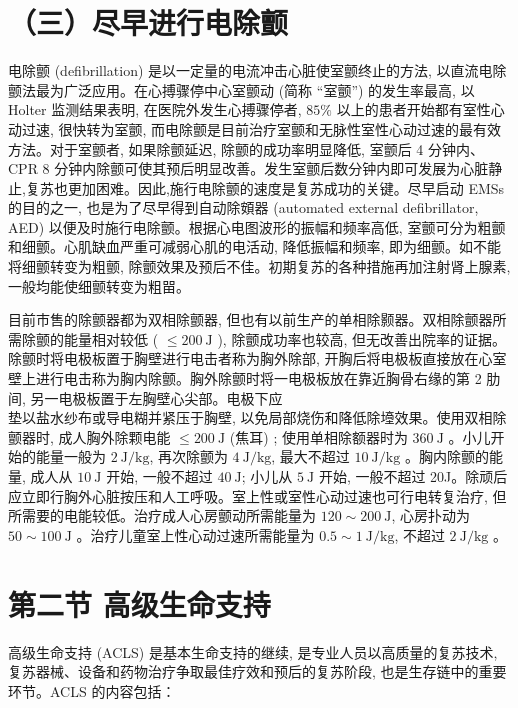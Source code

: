 \documentclass[10pt]{article}
\begin{document}
\section*{（三）尽早进行电除颤}
电除颤 (defibrillation) 是以一定量的电流冲击心脏使室颤终止的方法, 以直流电除颤法最为广泛应用。在心搏骤停中心室颤动 (简称 “室颤”) 的发生率最高, 以 Holter 监测结果表明, 在医院外发生心搏骤停者, $85 \%$ 以上的患者开始都有室性心动过速, 很快转为室颤, 而电除颤是目前治疗室颤和无脉性室性心动过速的最有效方法。对于室颤者, 如果除颤延迟, 除颤的成功率明显降低, 室颤后 4 分钟内、CPR 8 分钟内除颤可使其预后明显改善。发生室颤后数分钟内即可发展为心脏静止,复苏也更加困难。因此,施行电除颤的速度是复苏成功的关键。尽早启动 EMSs 的目的之一, 也是为了尽早得到自动除頞器 (automated external defibrillator, AED) 以便及时施行电除颤。根据心电图波形的振幅和频率高低, 室颤可分为粗颤和细颤。心肌缺血严重可减弱心肌的电活动, 降低振幅和频率, 即为细颤。如不能将细颤转变为粗颤, 除颤效果及预后不佳。初期复苏的各种措施再加注射肾上腺素, 一般均能使细颤转变为粗㽞。

目前市售的除颤器都为双相除颤器, 但也有以前生产的单相除颢器。双相除颤器所需除颤的能量相对较低 ( $\leqslant 200 \mathrm{~J}$ ), 除颤成功率也较高, 但无改善出院率的证据。除颤时将电极板置于胸壁进行电击者称为胸外除部, 开胸后将电极板直接放在心室壁上进行电击称为胸内除颤。胸外除颤时将一电极板放在靠近胸骨右缘的第 2 肋间, 另一电极板置于左胸壁心尖部。电极下应\\
垫以盐水纱布或导电糊并紧压于胸壁, 以免局部烧伤和降低除㙵效果。使用双相除颤器时, 成人胸外除颗电能 $\leqslant 200 \mathrm{~J}$ (焦耳) ; 使用单相除额器时为 $360 \mathrm{~J}$ 。小儿开始的能量一般为 $2 \mathrm{~J} / \mathrm{kg}$, 再次除颤为 $4 \mathrm{~J} / \mathrm{kg}$, 最大不超过 $10 \mathrm{~J} / \mathrm{kg}$ 。胸内除颤的能量, 成人从 $10 \mathrm{~J}$ 开始, 一般不超过 $40 \mathrm{~J}$; 小儿从 $5 \mathrm{~J}$ 开始, 一般不超过 20J。除顽后应立即行胸外心脏按压和人工呼吸。室上性或室性心动过速也可行电转复治疗, 但所需要的电能较低。治疗成人心房颤动所需能量为 $120 \sim 200 \mathrm{~J}$, 心房扑动为 $50 \sim 100 \mathrm{~J}$ 。治疗儿童室上性心动过速所需能量为 $0.5 \sim 1 \mathrm{~J} / \mathrm{kg}$, 不超过 $2 \mathrm{~J} / \mathrm{kg}$ 。

\section*{第二节 高级生命支持}
高级生命支持 (ACLS) 是基本生命支持的继续, 是专业人员以高质量的复苏技术, 复苏器械、设备和药物治疗争取最佳疗效和预后的复苏阶段, 也是生存链中的重要环节。ACLS 的内容包括：
\end{document}
